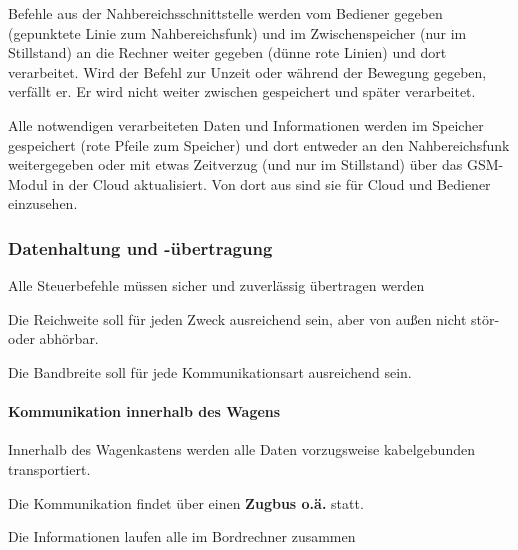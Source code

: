 Befehle aus der Nahbereichsschnittstelle werden vom Bediener gegeben (gepunktete Linie zum Nahbereichsfunk) und im Zwischenspeicher (nur im Stillstand) an die Rechner weiter gegeben (dünne rote Linien) und dort verarbeitet. Wird der Befehl zur Unzeit oder während der Bewegung gegeben, verfällt er. Er wird nicht weiter zwischen gespeichert und später verarbeitet.\par
Alle notwendigen verarbeiteten Daten und Informationen werden im Speicher gespeichert (rote Pfeile zum Speicher) und dort entweder an den Nahbereichsfunk weitergegeben oder mit etwas Zeitverzug (und nur im Stillstand) über das GSM-Modul in der Cloud aktualisiert. Von dort aus sind sie für Cloud und Bediener einzusehen.\par

\subsubsection{Datenhaltung und -übertragung}
\begin{feat}
Alle Steuerbefehle müssen sicher und zuverlässig übertragen werden
\end{feat}
\begin{feat}
Die Reichweite soll für jeden Zweck ausreichend sein, aber von außen nicht stör- oder abhörbar.
\end{feat}
\begin{feat}
Die Bandbreite soll für jede Kommunikationsart ausreichend sein.
\end{feat}

\paragraph{Kommunikation innerhalb des Wagens}
\begin{feat}
Innerhalb des Wagenkastens werden alle Daten vorzugsweise kabelgebunden transportiert. 
\end{feat}
\begin{feat}
Die Kommunikation findet über einen \textbf{Zugbus o.ä.} statt.
\end{feat}
\begin{feat}
Die Informationen laufen alle im Bordrechner zusammen
\end{feat}

